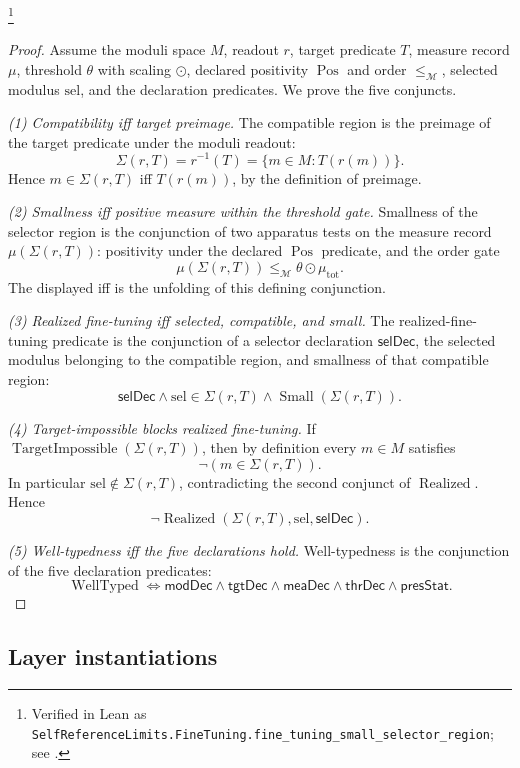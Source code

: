 \documentclass[11pt]{article}
\theoremstyle{definition}
\begin{document}
\footnote{\raggedright Verified in Lean as
\texttt{SelfReferenceLimits.\allowbreak{}FineTuning.\allowbreak{}fine\_tuning\_small\_selector\_region};
see .}
\begin{proof}
Assume the moduli space \(M\), readout \(r\), target predicate \(T\),
measure record \(\mu\), threshold \(\theta\) with scaling \(\odot\),
declared positivity \(\operatorname{Pos}\) and order
\(\le_{\mathcal M}\), selected modulus \(\mathrm{sel}\), and the
declaration predicates.  We prove the five conjuncts.

\emph{(1) Compatibility iff target preimage.}
The compatible region is the preimage of the target predicate under
the moduli readout:
\[
  \Sigma(r,T)=r^{-1}(T)=\{m\in M:T(r(m))\}.
\]
Hence \(m\in\Sigma(r,T)\) iff \(T(r(m))\), by the definition of
preimage.

\emph{(2) Smallness iff positive measure within the threshold gate.}
Smallness of the selector region is the conjunction of two apparatus
tests on the measure record \(\mu(\Sigma(r,T))\): positivity under
the declared \(\operatorname{Pos}\) predicate, and the order gate
\[
  \mu(\Sigma(r,T))\le_{\mathcal M}\theta\odot\mu_{\mathrm{tot}}.
\]
The displayed iff is the unfolding of this defining conjunction.

\emph{(3) Realized fine-tuning iff selected, compatible, and small.}
The realized-fine-tuning predicate is the conjunction of a selector
declaration \(\mathsf{selDec}\), the selected modulus belonging to
the compatible region, and smallness of that compatible region:
\[
  \mathsf{selDec}
  \wedge
  \mathrm{sel}\in\Sigma(r,T)
  \wedge
  \operatorname{Small}(\Sigma(r,T)).
\]

\emph{(4) Target-impossible blocks realized fine-tuning.}
If \(\operatorname{TargetImpossible}(\Sigma(r,T))\), then by
definition every \(m\in M\) satisfies
\[
  \neg(m\in\Sigma(r,T)).
\]
In particular \(\mathrm{sel}\notin\Sigma(r,T)\), contradicting the
second conjunct of \(\operatorname{Realized}\).  Hence
\[
  \neg\operatorname{Realized}(\Sigma(r,T),\mathrm{sel},\mathsf{selDec}).
\]

\emph{(5) Well-typedness iff the five declarations hold.}
Well-typedness is the conjunction of the five declaration predicates:
\[
  \operatorname{WellTyped}
  \iff
  \mathsf{modDec}\wedge\mathsf{tgtDec}\wedge\mathsf{meaDec}
  \wedge\mathsf{thrDec}\wedge\mathsf{presStat}.
\]
\end{proof}

\subsection*{Layer instantiations}\label{layer-inst:F47}
\end{document}

